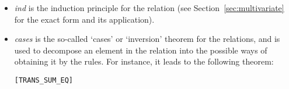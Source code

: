 \begin{itemize}
\begin{equation*}
\end{equation*}
\begin{equation*}
\infer[\HOLRuleName{RESTR}]{\HOLinline{\ensuremath{(\nu}\HOLFreeVar{L}\ensuremath{)} \HOLFreeVar{E} \HOLTokenTransBegin\HOLFreeVar{u}\HOLTokenTransEnd \ensuremath{(\nu}\HOLFreeVar{L}\ensuremath{)} \HOLFreeVar{E\sp{\prime}}}}{\HOLinline{\HOLFreeVar{E} \HOLTokenTransBegin\HOLFreeVar{u}\HOLTokenTransEnd \HOLFreeVar{E\sp{\prime}}}&\HOLinline{\HOLFreeVar{u} \HOLSymConst{\ensuremath{=}} \HOLSymConst{\ensuremath{\tau}} \HOLSymConst{\HOLTokenDisj{}} \HOLFreeVar{u} \HOLSymConst{\ensuremath{=}} \HOLConst{label} \HOLFreeVar{l} \HOLSymConst{\HOLTokenConj{}} \HOLFreeVar{l} \HOLSymConst{\HOLTokenNotIn{}} \HOLFreeVar{L} \HOLSymConst{\HOLTokenConj{}} \HOLConst{COMPL} \HOLFreeVar{l} \HOLSymConst{\HOLTokenNotIn{}} \HOLFreeVar{L}}}
\end{equation*}
\begin{equation*}
\infer[\HOLRuleName{RELABELING}]{\HOLinline{\HOLConst{relab} \HOLFreeVar{E} \HOLFreeVar{rf} \HOLTokenTransBegin\HOLConst{relabel} \HOLFreeVar{rf} \HOLFreeVar{u}\HOLTokenTransEnd \HOLConst{relab} \HOLFreeVar{E\sp{\prime}} \HOLFreeVar{rf}}}{\HOLinline{\HOLFreeVar{E} \HOLTokenTransBegin\HOLFreeVar{u}\HOLTokenTransEnd \HOLFreeVar{E\sp{\prime}}}}
\end{equation*}
\begin{equation*}
\infer[\HOLRuleName{REC}]{\HOLinline{\HOLConst{rec} \HOLFreeVar{X} \HOLFreeVar{E} \HOLTokenTransBegin\HOLFreeVar{u}\HOLTokenTransEnd \HOLFreeVar{E\sb{\mathrm{1}}}}}{\HOLinline{\ensuremath{[}\HOLConst{rec} \HOLFreeVar{X} \HOLFreeVar{E}\ensuremath{/}\HOLFreeVar{X}\ensuremath{]} \HOLFreeVar{E} \HOLTokenTransBegin\HOLFreeVar{u}\HOLTokenTransEnd \HOLFreeVar{E\sb{\mathrm{1}}}}}
\end{equation*}
\item \emph{ind} is the induction principle for the relation
  (see Section~\ref{sec:multivariate} for the exact form and its application).
\item \emph{cases} is the so-called `cases' or `inversion' theorem for
  the relations, and is used to decompose an element in the relation into the possible ways of
  obtaining it by the rules. For instance, it leads to the following
  theorem:
\begin{alltt}
\HOLTokenTurnstile{}  \HOLSymConst{\ensuremath{+}}  \HOLTokenTransBegin{}\HOLTokenTransEnd {} \HOLSymConst{\HOLTokenEquiv{}}  \HOLTokenTransBegin{}\HOLTokenTransEnd {} \HOLSymConst{\HOLTokenDisj{}}  \HOLTokenTransBegin{}\HOLTokenTransEnd {}\hfill{[TRANS_SUM_EQ]}
\end{alltt}
\end{itemize}

